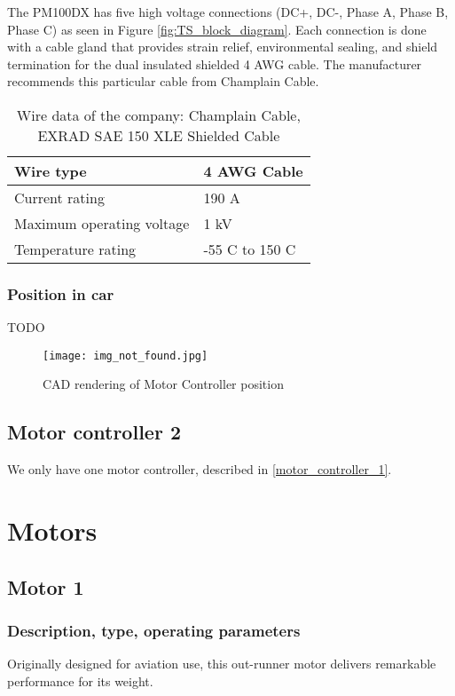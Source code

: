 \documentclass{article}
\begin{document}
The PM100DX has five high voltage connections (DC+, DC-, Phase A, Phase B, Phase C) as seen in Figure \ref{fig:TS_block_diagram}. Each connection is done with a cable gland that provides strain relief, environmental sealing, and shield termination for the dual insulated shielded 4 AWG cable. The manufacturer recommends this particular cable from Champlain Cable. 

\begin{table}[H]
	\centering
	\begin{tabular}{|l|l|}
	\hline
	Wire type & 4 AWG Cable\\ \hline
	Current rating & 190 A \\ \hline
	Maximum operating voltage & 1 kV \\ \hline
	Temperature rating & -55 \degree C to 150 \degree C \\ \hline
	\end{tabular}
	\caption{Wire data of the company: Champlain Cable, EXRAD SAE 150 XLE Shielded Cable}
	\label{motortomcwire}
\end{table}

\subsubsection{Position in car}
TODO
\begin{figure}[h]
    \centering
    \texttt{[image: img\_not\_found.jpg]}
    \caption{CAD rendering of Motor Controller position}
    \label{mc_cad}
\end{figure}

\subsection{Motor controller 2}
We only have one motor controller, described in \ref{motor_controller_1}.

\section{Motors}\label{motors}
\subsection{Motor 1}\label{motor_1}

\subsubsection{Description, type, operating parameters}
Originally designed for aviation use, this out-runner motor delivers remarkable performance for its weight. 
\end{document}
